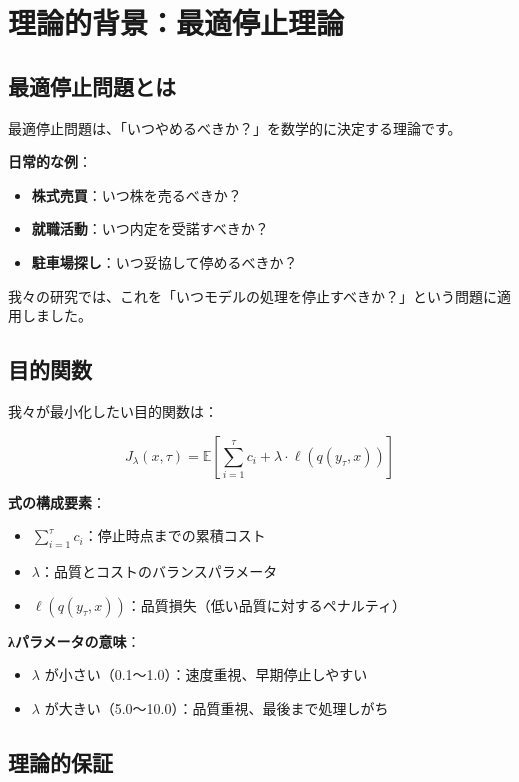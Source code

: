 \documentclass[a4paper,12pt]{jsarticle}
\begin{document}
\section{理論的背景：最適停止理論}

\subsection{最適停止問題とは}

最適停止問題は、「いつやめるべきか？」を数学的に決定する理論です。

\textbf{日常的な例}：
\begin{itemize}
\item \textbf{株式売買}：いつ株を売るべきか？
\item \textbf{就職活動}：いつ内定を受諾すべきか？
\item \textbf{駐車場探し}：いつ妥協して停めるべきか？
\end{itemize}

我々の研究では、これを「いつモデルの処理を停止すべきか？」という問題に適用しました。

\subsection{目的関数}

我々が最小化したい目的関数は：

\begin{equation}
J_\lambda(x, \tau) = \mathbb{E}\left[\sum_{i=1}^{\tau} c_i + \lambda \cdot \ell(q(y_\tau, x))\right]
\end{equation}

\textbf{式の構成要素}：
\begin{itemize}
\item $\sum_{i=1}^{\tau} c_i$：停止時点までの累積コスト
\item $\lambda$：品質とコストのバランスパラメータ
\item $\ell(q(y_\tau, x))$：品質損失（低い品質に対するペナルティ）
\end{itemize}

\textbf{λパラメータの意味}：
\begin{itemize}
\item $\lambda$ が小さい（0.1〜1.0）：速度重視、早期停止しやすい
\item $\lambda$ が大きい（5.0〜10.0）：品質重視、最後まで処理しがち
\end{itemize}

\subsection{理論的保証}
\end{document}
